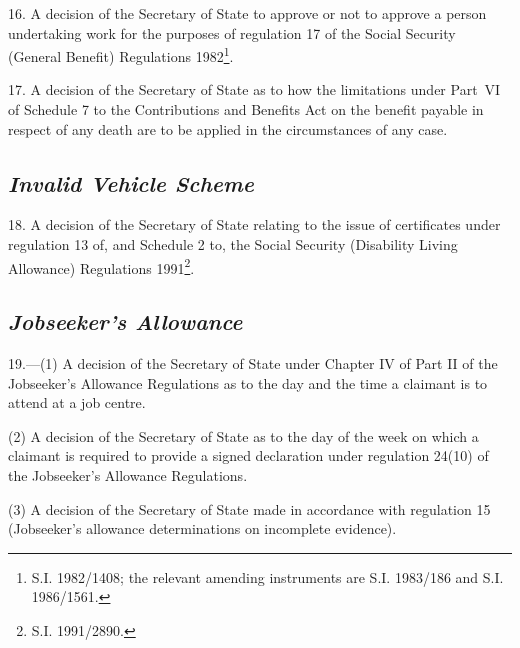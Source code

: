 \documentclass[12pt,a4paper]{article}
\begin{document}
\medskip

16.  A decision of the Secretary of State to approve or not to approve a person undertaking work for the purposes of regulation 17 of the Social Security (General Benefit) Regulations 1982\footnote{\frenchspacing S.I. 1982/1408; the relevant amending instruments are S.I. 1983/186 and S.I. 1986/1561.}.

\medskip

17.  A decision of the Secretary of State as to how the limitations under Part~VI of Schedule 7 to the Contributions and Benefits Act on the benefit payable in respect of any death are to be applied in the circumstances of any case.

\subsection*{\itshape Invalid Vehicle Scheme}

18.  A decision of the Secretary of State relating to the issue of certificates under regulation 13 of, and Schedule 2 to, the Social Security (Disability Living Allowance) Regulations 1991\footnote{\frenchspacing S.I. 1991/2890.}.

\subsection*{\itshape Jobseeker’s Allowance}

19.—(1) A decision of the Secretary of State under Chapter IV of Part II of the Jobseeker’s Allowance Regulations as to the day and the time a claimant is to attend at a job centre.

(2) A decision of the Secretary of State as to the day of the week on which a claimant is required to provide a signed declaration under regulation 24(10) of the Jobseeker’s Allowance Regulations.

(3) A decision of the Secretary of State 
made in accordance with regulation 15 (Jobseeker’s allowance determinations on incomplete evidence).
\end{document}

